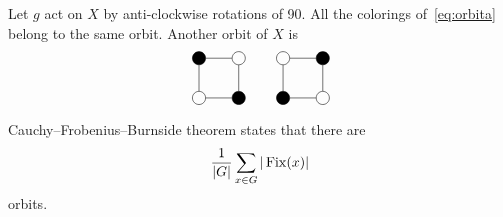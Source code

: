 \begin{optional}
\begin{example}
Let $g$ act on $X$ by anti-clockwise rotations  
of 90\textdegree. All the colorings of~\eqref{eq:orbita} belong to the same orbit. 
Another orbit of $X$ is
\[
\begin{tikzpicture}
    \node[shape=circle,draw=black,fill=black] (A) at (1,0) {};
    \node[shape=circle,draw=black] (B) at (1,1) {};
    \node[shape=circle,draw=black,fill=black] (C) at (0,1) {};
    \node[shape=circle,draw=black] (D) at (0,0) {};
    \path [-](A) edge node[left]{} (B);
    \path [-](B) edge node[left]{} (C);
    \path [-](C) edge node[left]{} (D);
    \path [-](D) edge node[left]{} (A);
\end{tikzpicture}
\qquad
\begin{tikzpicture}
    \node[shape=circle,draw=black] (A) at (1,0) {};
    \node[shape=circle,draw=black,fill=black] (B) at (1,1) {};
    \node[shape=circle,draw=black] (C) at (0,1) {};
    \node[shape=circle,draw=black,fill=black] (D) at (0,0) {};
    \path [-](A) edge node[left]{} (B);
    \path [-](B) edge node[left]{} (C);
    \path [-](C) edge node[left]{} (D);
    \path [-](D) edge node[left]{} (A);
\end{tikzpicture}
\]

Cauchy--Frobenius--Burnside theorem states that
there are  
\[
\frac{1}{|G|}\sum_{x\in G}|\operatorname{Fix}(x)|
\]
orbits. 


\end{example}
\end{optional}
